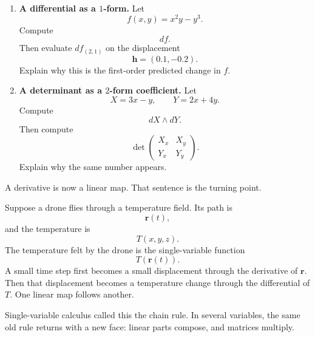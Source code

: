 \begin{enumerate}
\item \textbf{A differential as a \(1\)-form.}
Let
\[
    f(x,y)=x^2y-y^3.
\]
Compute
\[
    df.
\]
Then evaluate \(df_{(2,1)}\) on the displacement
\[
    \mathbf h=(0.1,-0.2).
\]
Explain why this is the first-order predicted change in \(f\).

\item \textbf{A determinant as a \(2\)-form coefficient.}
Let
\[
    X=3x-y,
    \qquad
    Y=2x+4y.
\]
Compute
\[
    dX\wedge dY.
\]
Then compute
\[
    \det
    \begin{pmatrix}
    X_x & X_y\\
    Y_x & Y_y
    \end{pmatrix}.
\]
Explain why the same number appears.
\end{enumerate}

A derivative is now a linear map.  That sentence is the turning point.

Suppose a drone flies through a temperature field.  Its path is
\[
    \mathbf r(t),
\]
and the temperature is
\[
    T(x,y,z).
\]
The temperature felt by the drone is the single-variable function
\[
    T(\mathbf r(t)).
\]
A small time step first becomes a small displacement through the derivative of
\(\mathbf r\).  Then that displacement becomes a temperature change through the
differential of \(T\).  One linear map follows another.

Single-variable calculus called this the chain rule.  In several variables, the same old
rule returns with a new face: linear parts compose, and matrices multiply.
